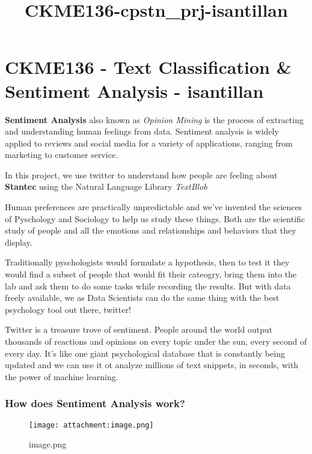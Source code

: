 \documentclass[11pt]{article}
\title{CKME136-cpstn\_prj-isantillan}
\makeatletter
\def\maxwidth{\ifdim\Gin@nat@width>\linewidth\linewidth
    \else\Gin@nat@width\fi}
\let\Oldincludegraphics\includegraphics
\renewcommand{\includegraphics}[1]{\Oldincludegraphics[width=.8\maxwidth]{#1}}
\makeatother
\begin{document}
    
    
    \maketitle
    
    

    
    \section{CKME136 - Text Classification \& Sentiment Analysis -
isantillan}\label{ckme136---text-classification-sentiment-analysis---isantillan}

    \textbf{Sentiment Analysis} also known as \emph{Opinion Mining} is the
process of extracting and understanding human feelings from data.
Sentiment analysis is widely applied to reviews and social media for a
variety of applications, ranging from marketing to customer service.

    In this project, we use twitter to understand how people are feeling
about \textbf{Stantec} using the Natural Language Library
\emph{TextBlob}

    Human preferences are practically unpredictable and we've invented the
sciences of Pyschology and Sociology to help us study these things. Both
are the scientific study of people and all the emotions and
relationships and behaviors that they display.

Traditionally pyschologists would formulate a hypothesis, then to test
it they would find a subset of people that would fit their cateogry,
bring them into the lab and ask them to do some tasks while recording
the results. But with data freely available, we as Data Scientists can
do the same thing with the best psychology tool out there, twitter!

Twitter is a treasure trove of sentiment. People around the world output
thousands of reactions and opinions on every topic under the sun, every
second of every day. It's like one giant psychological database that is
constantly being updated and we can use it ot analyze millions of text
snippets, in seconds, with the power of machine learning.

    \subsubsection{How does Sentiment Analysis
work?}\label{how-does-sentiment-analysis-work}

    \begin{figure}
\centering
\texttt{[image: attachment:image.png]}
\caption{image.png}
\end{figure}
\end{document}
